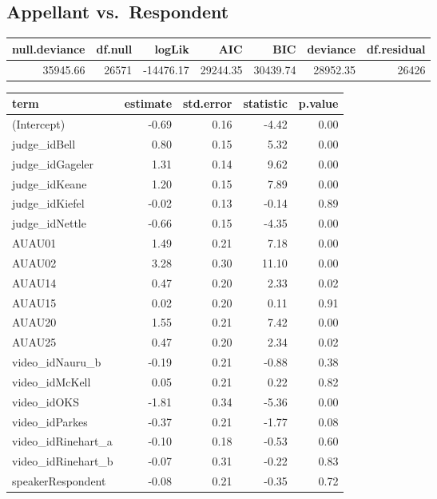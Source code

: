 \documentclass{monashthesis}
\begin{document}
\hypertarget{appellant-vs.-respondent}{%
\subsection{Appellant vs.~Respondent}\label{appellant-vs.-respondent}}

\begin{tabular}{r|r|r|r|r|r|r}
\hline
null.deviance & df.null & logLik & AIC & BIC & deviance & df.residual\\
\hline
35945.66 & 26571 & -14476.17 & 29244.35 & 30439.74 & 28952.35 & 26426\\
\hline
\end{tabular}

\begin{tabular}{l|r|r|r|r}
\hline
term & estimate & std.error & statistic & p.value\\
\hline
(Intercept) & -0.69 & 0.16 & -4.42 & 0.00\\
\hline
judge\_idBell & 0.80 & 0.15 & 5.32 & 0.00\\
\hline
judge\_idGageler & 1.31 & 0.14 & 9.62 & 0.00\\
\hline
judge\_idKeane & 1.20 & 0.15 & 7.89 & 0.00\\
\hline
judge\_idKiefel & -0.02 & 0.13 & -0.14 & 0.89\\
\hline
judge\_idNettle & -0.66 & 0.15 & -4.35 & 0.00\\
\hline
AUAU01 & 1.49 & 0.21 & 7.18 & 0.00\\
\hline
AUAU02 & 3.28 & 0.30 & 11.10 & 0.00\\
\hline
AUAU14 & 0.47 & 0.20 & 2.33 & 0.02\\
\hline
AUAU15 & 0.02 & 0.20 & 0.11 & 0.91\\
\hline
AUAU20 & 1.55 & 0.21 & 7.42 & 0.00\\
\hline
AUAU25 & 0.47 & 0.20 & 2.34 & 0.02\\
\hline
video\_idNauru\_b & -0.19 & 0.21 & -0.88 & 0.38\\
\hline
video\_idMcKell & 0.05 & 0.21 & 0.22 & 0.82\\
\hline
video\_idOKS & -1.81 & 0.34 & -5.36 & 0.00\\
\hline
video\_idParkes & -0.37 & 0.21 & -1.77 & 0.08\\
\hline
video\_idRinehart\_a & -0.10 & 0.18 & -0.53 & 0.60\\
\hline
video\_idRinehart\_b & -0.07 & 0.31 & -0.22 & 0.83\\
\hline
speakerRespondent & -0.08 & 0.21 & -0.35 & 0.72\\

\end{tabular}
\end{document}
